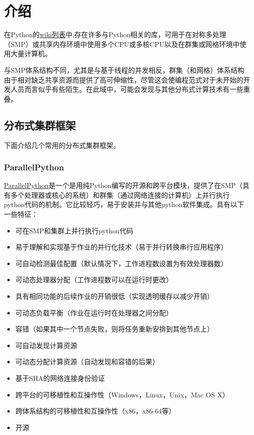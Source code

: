 \section{介绍}

在Python的\href{https://wiki.python.org/moin/ParallelProcessing}{wiki列表}中,存在许多与Python相关的库，可用于在对称多处理（SMP）或共享内存环境中使用多个CPU或多核CPU以及在群集或网格环境中使用大量计算机。

与SMP体系结构不同，尤其是与基于线程的并发相反，群集（和网格）体系结构由于相对缺乏共享资源而提供了高可伸缩性，尽管这会使编程范式对于未开始的开发人员而言似乎有些陌生。在此域中，可能会发现与其他分布式计算技术有一些重叠。

\subsection{分布式集群框架}
下面介绍几个常用的分布式集群框架。

\subsubsection{ParallelPython}
\href{https://www.parallelpython.com/}{ParallelPython}是一个是用纯Python编写的开源和跨平台模块，提供了在SMP（具有多个处理器或核心的系统）和群集（通过网络连接的计算机）上并行执行python代码的机制。它比较轻巧，易于安装并与其他python软件集成。具有以下一些特征：
\begin{itemize}
    \item 可在SMP和集群上并行执行python代码
    \item 易于理解和实现基于作业的并行化技术（易于并行转换串行应用程序）
    \item 可自动检测最佳配置（默认情况下，工作进程数设置为有效处理器数）
    \item 可动态处理器分配（工作进程数可以在运行时更改）
    \item 具有相同功能的后续作业的开销很低（实现透明缓存以减少开销）
    \item 可动态负载平衡（作业在运行时在处理器之间分配）
    \item 容错（如果其中一个节点失败，则将任务重新安排到其他节点上）
    \item 可自动发现计算资源
    \item 可动态分配计算资源（自动发现和容错的后果）
    \item 基于SHA的网络连接身份验证
    \item 跨平台的可移植性和互操作性（Windows，Linux，Unix，Mac OS X）
    \item 跨体系结构的可移植性和互操作性（x86，x86-64等）
    \item 开源
\end{itemize}


